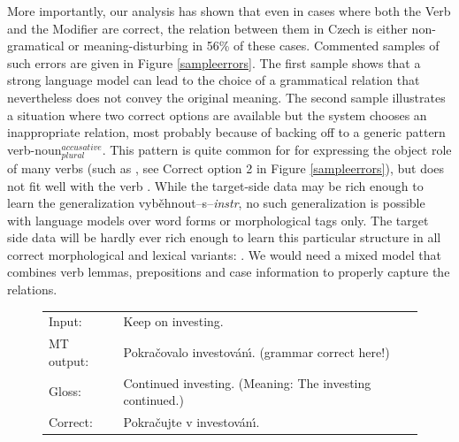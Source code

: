 \documentclass[10pt]{report}
\theoremstyle{plain}
\begin{document}
{{More
importantly, our analysis has shown that even in cases where both the Verb and
the Modifier are correct, the relation between them in Czech is either
non-gramatical or meaning-disturbing in 56\% of these cases. Commented samples
of such errors are given in Figure \ref{sampleerrors}. The first sample shows
that a strong language model can lead to the choice of a grammatical relation
that nevertheless does not convey the original meaning. The second sample
illustrates a situation where two correct options are available but the
system chooses an inappropriate relation, most probably because of backing off to
a generic pattern verb-noun$_{plural}^{accusative}$. This pattern
is quite common for
for expressing the object role of
many verbs (such as , see Correct
option 2 in Figure \ref{sampleerrors}), but does not fit well with the verb
. While the target-side data
may be rich enough to learn the generalization vyb\v{e}hnout--s--{\it instr},
no
such generalization is possible with language models over word forms or
morphological tags only. The
target side data will be hardly ever rich enough to learn this particular
structure in all correct morphological and lexical variants:
. We would need a 
mixed
model that combines verb lemmas, prepositions and case information to properly
capture the relations.


\begin{figure}

\begin{center}
{\small
\begin{tabular}{|ll|}
\hline
Input:      &  {Keep on investing.}\\
MT output:  &  Pokra\v{c}ovalo investov\'{a}n\'{\i}. (grammar correct here!)\\
Gloss:      &  Continued investing. (Meaning: The investing continued.)\\
Correct:    &  {Pokra\v{c}ujte v investov\'{a}n\'{\i}.}\\
\hline
\end{tabular}
}
\end{center}



\end{figure}}}
\end{document}
